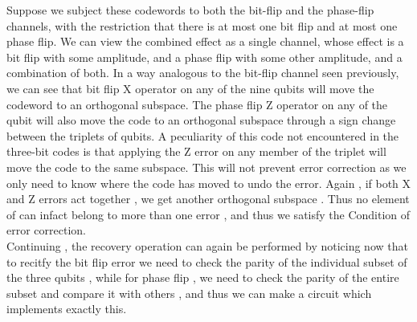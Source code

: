Suppose we subject these codewords to both the bit-flip and the phase-flip channels, with the restriction that there is at most one bit flip and at most one phase flip. We can view the combined effect as a single channel, whose effect is a bit flip with some amplitude, and a phase flip with some other amplitude, and a combination of both.
In a way analogous to the bit-flip channel seen previously, we can see that bit flip X operator on any of the nine qubits will move the codeword to an orthogonal subspace. The phase flip Z operator on any of the qubit will also move the code to an orthogonal subspace through a sign change between the triplets of qubits. A peculiarity of this code not encountered in the three-bit codes is that applying the Z error on any member of the triplet will move the code to the same subspace. This will not prevent error correction as we only need to know where the code has moved to undo the error.
Again , if both X and Z errors act together , we get another orthogonal subspace . Thus no element of can infact belong to more than one error , and thus we satisfy the Condition of error correction. \\
Continuing  , the recovery operation can again be performed by noticing now that to recitfy the bit flip error we need to check the parity of the individual subset of the three qubits , while for phase flip  , we need to check the parity of the entire subset and compare it with others , and thus we can make a circuit which implements exactly this. 
\newpage
